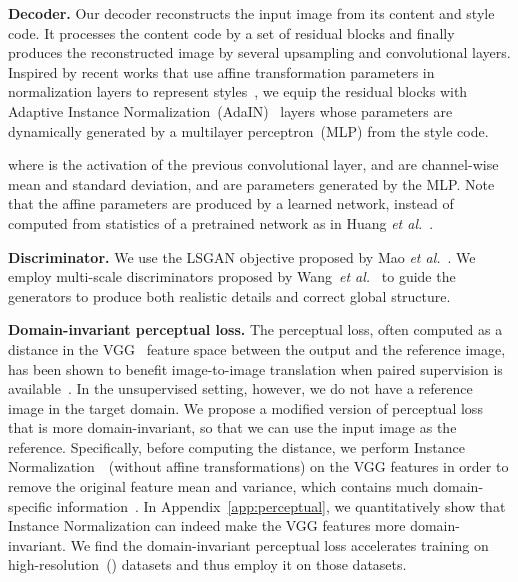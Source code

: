 \documentclass[runningheads]{llncs}
\newcommand{\vpara}[1]{\vspace{0.05in}\noindent\textbf{#1}}
\def\etal{\emph{et al.}\xspace}
\begin{document}
	\vpara{Decoder.} Our decoder reconstructs the input image from its content and style code. It processes the content code by a set of residual blocks and finally produces the reconstructed image by several upsampling and convolutional layers.
	Inspired by recent works that use affine transformation parameters in normalization layers to represent styles~\cite{huang2017adain,dumoulin2017learned,wang2017zm,ghiasi2017exploring}, we equip the residual blocks with Adaptive Instance Normalization~(AdaIN)~\cite{huang2017adain} layers whose parameters are dynamically generated by a multilayer perceptron~(MLP) from the style code.

	where  is the activation of the previous convolutional layer,  and  are channel-wise mean and standard deviation,  and  are parameters generated by the MLP. Note that the affine parameters are produced by a learned network, instead of computed from statistics of a pretrained network as in Huang \etal~\cite{huang2017adain}.


	\vpara{Discriminator.}  We use the LSGAN objective proposed by Mao \etal~\cite{mao2017least}.
	We employ multi-scale discriminators proposed by Wang~\etal~\cite{wang2018high} to guide the generators to produce both realistic details and correct global structure. 
	
	\vpara{Domain-invariant perceptual loss.} The perceptual loss, often computed as a distance in the VGG~\cite{simonyan2015very} feature space between the output and the reference image, has been shown to benefit image-to-image translation when paired supervision is available~\cite{chen2017photographic,wang2018high}. 
	In the unsupervised setting, however, we do not have a reference image in the target domain.
We propose a modified version of perceptual loss that is more domain-invariant, so that we can use the input image as the reference. Specifically, before computing the distance, we perform Instance Normalization~\cite{ulyanov2017improved}~(without affine transformations) on the VGG features in order to remove the original feature mean and variance, which contains much domain-specific information~\cite{huang2017adain,li2016revisiting}. In Appendix~\ref{app:perceptual}, we quantitatively show that Instance Normalization can indeed make the VGG features more domain-invariant. We find the domain-invariant perceptual loss accelerates training on high-resolution~() datasets and thus employ it on those datasets.




	
	
\end{document}
